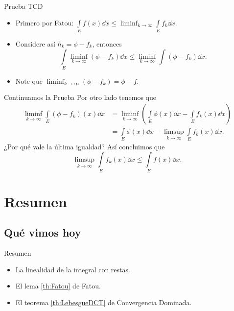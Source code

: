 \documentclass[utf8]{beamer}
\theoremstyle{plain}
\theoremstyle{definition}
\theoremstyle{remark}
\numberwithin{equation}{section}
\renewcommand{\leq}{\leqslant}          %
\renewcommand{\.}{\Cdot}                %
\begin{document}
\begin{frame}{Prueba TCD}
  \begin{itemize}
    \item Primero por Fatou: $\displaystyle\int\limits_Ef(x)\dd x\leq \liminf_{k\to\infty}\int\limits_Ef_k\dd x$.
    \item Considere así $h_k=\phi-f_k$, entonces 
    $$\int\limits_E\liminf_{k\to\infty}(\phi-f_k)\dd x\leq \liminf_{k\to\infty}\int(\phi-f_k)\dd x.$$
    \item Note que $\displaystyle \liminf_{k\to\infty}(\phi-f_k)=\phi-f$.
  \end{itemize}
\end{frame}

\begin{frame}{Continuamos la Prueba}
  Por otro lado tenemos que
  \begin{align*}
    \liminf_{k\to\infty}\int\limits_E(\phi-f_k)(x)\dd x&=\liminf_{k\to\infty}\left(\int\limits_E\phi(x)\dd x-\int\limits_Ef_k(x)\dd x\right)\\
    &=\int\limits_E\phi(x)\dd x-\limsup_{k\to\infty}\int\limits_Ef_k(x)\dd x.
  \end{align*}
  \alert{¿Por qué vale la última igualdad?} Así concluimos que 
  $$\limsup_{k\to\infty}\int\limits_E f_k(x)\dd x\leq \int\limits_Ef(x)\dd x.$$
\end{frame}
\section*{Resumen}

\subsection*{Qu\'e vimos hoy}

\begin{frame}{Resumen}

  \begin{itemize}
  \item La linealidad de la integral con restas.
  \item El lema \ref{th:Fatou} de Fatou.
  \item El teorema \ref{th:LebesgueDCT} de Convergencia Dominada.
  \end{itemize}
  
\end{frame}
\end{document}
